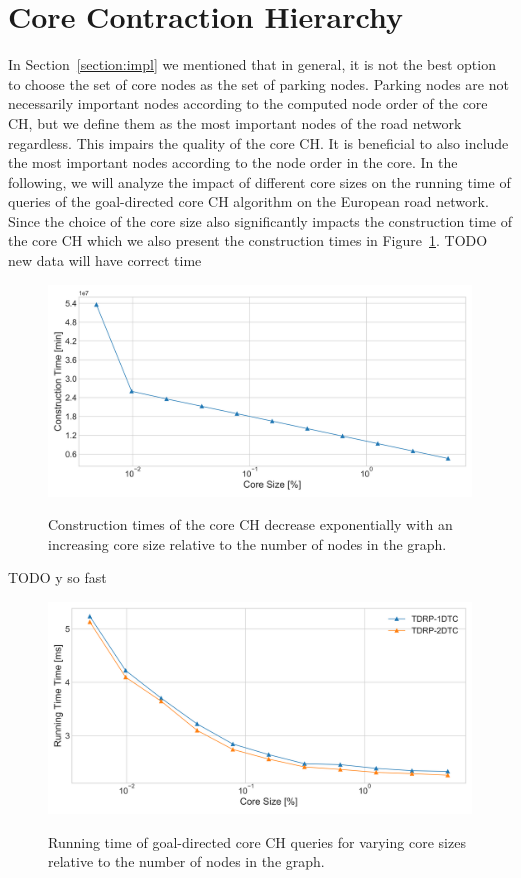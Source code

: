 \section{Core Contraction Hierarchy}
In Section~\ref{section:impl} we mentioned that in general, it is not the best option to choose the set of core nodes as the set of parking nodes. Parking nodes are not necessarily important nodes according to the computed node order of the core CH, but we define them as the most important nodes of the road network regardless. This impairs the quality of the core CH. It is beneficial to also include the most important nodes according to the node order in the core. In the following, we will analyze the impact of different core sizes on the running time of queries of the goal-directed core CH algorithm on the European road network. Since the choice of the core size also significantly impacts the construction time of the core CH which we also present the construction times in Figure~\ref{fig:preprocessing_time_core_ch}. TODO new data will have correct time

\begin{figure}[hbtp]
	\centering
	\includegraphics[width=.95\textwidth]{plots/thesis_core_sizes-csp-parking_europe_hgv-constr_time.png}
	\label{fig:preprocessing_time_core_ch}
	\caption{Construction times of the core CH decrease exponentially with an increasing core size relative to the number of nodes in the graph.}
\end{figure}

TODO y so fast

\begin{figure}[hbtp]
	\centering
	\includegraphics[width=.95\textwidth]{plots/thesis_core_sizes-csp-parking_europe_hgv-time_ms.png}
	\label{fig:query_time_core_ch_sizes}
	\caption{Running time of goal-directed core CH queries for varying core sizes relative to the number of nodes in the graph.}
\end{figure}
